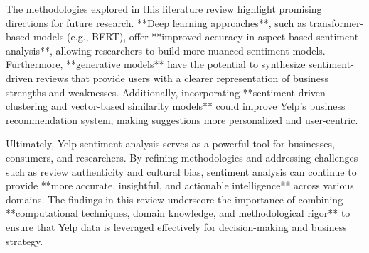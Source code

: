 \documentclass{article}
\begin{document}
The methodologies explored in this literature review highlight promising directions for future research. **Deep learning approaches**, such as transformer-based models (e.g., BERT), offer **improved accuracy in aspect-based sentiment analysis**, allowing researchers to build more nuanced sentiment models. Furthermore, **generative models** have the potential to synthesize sentiment-driven reviews that provide users with a clearer representation of business strengths and weaknesses. Additionally, incorporating **sentiment-driven clustering and vector-based similarity models** could improve Yelp’s business recommendation system, making suggestions more personalized and user-centric.

Ultimately, Yelp sentiment analysis serves as a powerful tool for businesses, consumers, and researchers. By refining methodologies and addressing challenges such as review authenticity and cultural bias, sentiment analysis can continue to provide **more accurate, insightful, and actionable intelligence** across various domains. The findings in this review underscore the importance of combining **computational techniques, domain knowledge, and methodological rigor** to ensure that Yelp data is leveraged effectively for decision-making and business strategy.

\newpage



\end{document}
